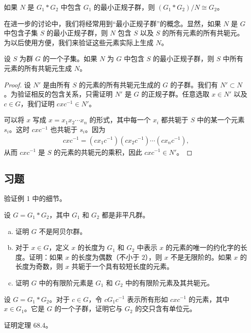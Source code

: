 \documentclass[../../main.tex]{subfiles}
\begin{document}
\begin{corollary}\label{corollary:ch11-quotient-by-normal}
如果 $N$ 是 $G_1*G_2$ 中包含 $G_1$ 的最小正规子群，则 $(G_1*G_2)/N\cong G_2$。
\end{corollary}

在进一步的讨论中，我们将经常用到“最小正规子群”的概念。显然，如果 $N$ 是 $G$ 中包含子集 $S$ 的最小正规子群，则 $N$ 包含 $S$ 以及 $S$ 的所有元素的所有共轭元。为以后使用方便，我们来验证这些元素实际上生成 $N$。

\begin{lemma}\label{lemma:ch11-least-normal-subgroup}
设 $S$ 为群 $G$ 的一个子集。如果 $N$ 为 $G$ 中包含 $S$ 的最小正规子群，则 $S$ 中所有元素的所有共轭元生成 $N$。
\end{lemma}

\begin{proof}
设 $N'$ 是由所有 $S$ 的元素的所有共轭元生成的 $G$ 的子群。我们有 $N'\subset N$。为验证相反的包含关系，只需证明 $N'$ 是 $G$ 的正规子群。任意选取 $x\in N'$ 以及 $c\in G$，我们证明 $cxc^{-1}\in N'$。

可以将 $x$ 写成 $x=x_1x_2\cdots x_n$ 的形式，其中每一个 $x_i$ 都共轭于 $S$ 中的某一个元素 $s_i$。这时 $cxc^{-1}$ 也共轭于 $s_i$。因为
\begin{align*}
cxc^{-1}=(cx_1c^{-1})(cx_2c^{-1})\cdots(cx_nc^{-1}),
\end{align*}
从而 $cxc^{-1}$ 是 $S$ 的元素的共轭元的乘积，因此 $cxc^{-1}\in N'$。
\end{proof}

\subsection*{习题}

\begin{exercise}\label{exercise:ch11-68-01}
验证例 1 中的细节。
\end{exercise}

\begin{exercise}\label{exercise:ch11-68-02}
设 $G=G_1*G_2$，其中 $G_1$ 和 $G_2$ 都是非平凡群。
\begin{enumerate}[(a)]
\item\label{item:ch11-68-02-a} 证明 $G$ 不是阿贝尔群。
\item 对于 $x\in G$，定义 $x$ 的长度为 $G_1$ 和 $G_2$ 中表示 $x$ 的元素的唯一的约化字的长度。证明：如果 $x$ 的长度为偶数（不小于 $2$），则 $x$ 不是无限阶的。如果 $x$ 的长度为奇数，则 $x$ 共轭于一个具有较短长度的元素。
\item 证明 $G$ 中的有限阶元素是 $G_1$ 和 $G_2$ 中的有限阶元素及其共轭元。
\end{enumerate}
\end{exercise}

\begin{exercise}\label{exercise:ch11-68-03}
设 $G=G_1*G_2$。对于 $c\in G$，令 $cG_1c^{-1}$ 表示所有形如 $cxc^{-1}$ 的元素，其中 $x\in G_1$。它是 $G$ 的一个子群，证明它与 $G_2$ 的交只含有单位元。
\end{exercise}

\begin{exercise}\label{exercise:ch11-68-04}
证明定理 68.4。
\end{exercise}
\end{document}
